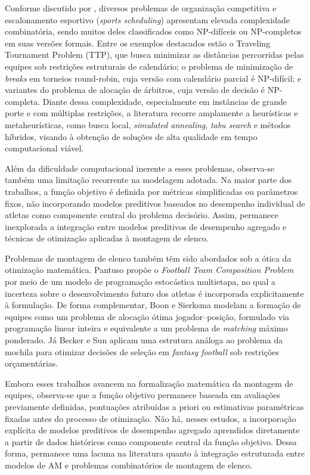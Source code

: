 Conforme discutido por \cite{Kendall2010}, diversos problemas de organização competitiva e escalonamento esportivo (\textit{sports scheduling}) 
apresentam elevada complexidade combinatória, sendo muitos deles classificados como NP-difíceis ou NP-completos em suas versões formais. 
Entre os exemplos destacados estão o Traveling Tournament Problem (TTP), que busca minimizar as distâncias percorridas pelas equipes sob restrições 
estruturais de calendário; o problema de minimização de \textit{breaks} em torneios round-robin, cuja versão com calendário parcial é NP-difícil; 
e variantes do problema de alocação de árbitros, cuja versão de decisão é NP-completa. Diante dessa complexidade, especialmente em instâncias 
de grande porte e com múltiplas restrições, a literatura recorre amplamente a heurísticas e metaheurísticas, como busca local, \textit{simulated annealing}, 
\textit{tabu search} e métodos híbridos, visando à obtenção de soluções de alta qualidade em tempo computacional viável.

Além da dificuldade computacional inerente a esses problemas, observa-se também uma limitação recorrente na modelagem adotada. 
Na maior parte dos trabalhos, a função objetivo é definida por métricas simplificadas ou parâmetros fixos, não incorporando modelos preditivos 
baseados no desempenho individual de atletas como componente central do problema decisório. Assim, permanece inexplorada a integração entre 
modelos preditivos de desempenho agregado e técnicas de otimização aplicadas à montagem de elenco.

Problemas de montagem de elenco também têm sido abordados sob a ótica da otimização matemática. Pantuso \cite{Pantuso2017} propõe o 
\textit{Football Team Composition Problem} por meio de um modelo de programação estocástica multietapa, no qual a incerteza sobre o desenvolvimento 
futuro dos atletas é incorporada explicitamente à formulação. De forma complementar, Boon e Sierksma \cite{Boon2003} modelam a formação de equipes 
como um problema de alocação ótima jogador–posição, formulado via programação linear inteira e equivalente a um problema de \textit{matching} máximo ponderado. 
Já Becker e Sun \cite{Becker2015} aplicam uma estrutura análoga ao problema da mochila para otimizar decisões de seleção em \textit{fantasy football} 
sob restrições orçamentárias.

Embora esses trabalhos avancem na formalização matemática da montagem de equipes, observa-se que a função objetivo permanece baseada em avaliações 
previamente definidas, pontuações atribuídas a priori ou estimativas paramétricas fixadas antes do processo de otimização. Não há, nesses estudos, 
a incorporação explícita de modelos preditivos de desempenho agregado aprendidos diretamente a partir de dados históricos como componente central 
da função objetivo. Dessa forma, permanece uma lacuna na literatura quanto à integração estruturada entre modelos de AM e problemas 
combinatórios de montagem de elenco.

